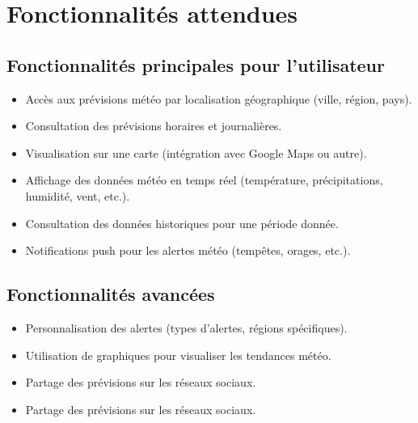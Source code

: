 \documentclass[a4paper,12pt]{article}
\begin{document}
\section{Fonctionnalités attendues}
\subsection{Fonctionnalités principales pour l'utilisateur}
\begin{itemize}
    \item Accès aux prévisions météo par localisation géographique (ville, région, pays).
    \item Consultation des prévisions horaires et journalières.
    \item Visualisation sur une carte (intégration avec Google Maps ou autre).
    \item Affichage des données météo en temps réel (température, précipitations, humidité, vent, etc.).
    \item Consultation des données historiques pour une période donnée.
    \item Notifications push pour les alertes météo (tempêtes, orages, etc.).
\end{itemize}

\subsection{Fonctionnalités avancées}
\begin{itemize}
    \item Personnalisation des alertes (types d’alertes, régions spécifiques).
    \item Utilisation de graphiques pour visualiser les tendances météo.
    \item Partage des prévisions sur les réseaux sociaux.
  \item Partage des prévisions sur les réseaux sociaux.

\end{itemize}
\end{document}
